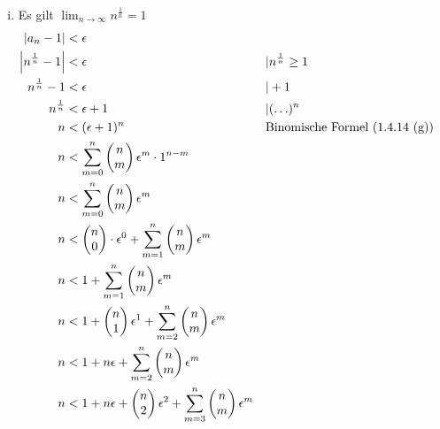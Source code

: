 \documentclass{article}
\begin{document}
\begin{enumerate}[(i)]
\item Es gilt $\lim_{n \to \infty} n^{\frac{1}{n}} = 1$
  \label{sec:1.2}
  \begin{align*}
    \abs{a_n - 1} &< \epsilon \\
    \abs{n^{\frac{1}{n}} - 1} &< \epsilon && | n^{\frac{1}{n}} \geq 1 \\
    n^{\frac{1}{n}} - 1 &< \epsilon && | + 1 \\
    n^{\frac{1}{n}} &< \epsilon + 1 && | (\ldots)^n \\
    n &< (\epsilon + 1)^n && \text{Binomische Formel (1.4.14 (g))} \\
    n &< \sum\limits_{m = 0}^n \begin{pmatrix}n \\ m \end{pmatrix} \epsilon^m \cdot  1^{n - m} \\
    n &< \sum\limits_{m = 0}^n \begin{pmatrix}n \\ m \end{pmatrix} \epsilon^m \\
    n &< \begin{pmatrix}n \\ 0 \end{pmatrix} \cdot \epsilon^0 + \sum\limits_{m = 1}^n \begin{pmatrix}n \\ m \end{pmatrix} \epsilon^m \\
    n &< 1 + \sum\limits_{m = 1}^n \begin{pmatrix}n \\ m \end{pmatrix} \epsilon^m \\
    n &< 1 + \begin{pmatrix}n \\ 1 \end{pmatrix} \epsilon^1 + \sum\limits_{m = 2}^n \begin{pmatrix}n \\ m \end{pmatrix} \epsilon^m \\
    n &< 1 + n\epsilon + \sum\limits_{m = 2}^n \begin{pmatrix}n \\ m \end{pmatrix} \epsilon^m \\
    n &< 1 + n\epsilon + \begin{pmatrix}n \\ 2 \end{pmatrix} \epsilon^2 + \sum\limits_{m = 3}^n \begin{pmatrix}n \\ m \end{pmatrix} \epsilon^m \\

\end{align*}
\end{enumerate}
\end{document}
